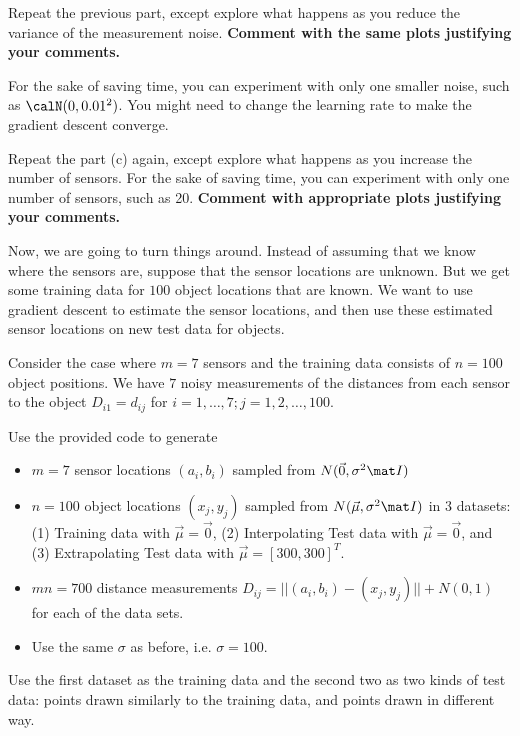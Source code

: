 \documentclass[preview]{standalone}
\begin{document}
\begin{Parts}
\Part Repeat the previous part, except explore what happens as you
reduce the variance of the measurement noise. {\bf Comment with the same plots justifying your comments.}

For the sake of saving time, you can experiment with only one smaller noise, such as $\calN(0, 0.01^2)$. You might need to change the learning rate to make the gradient descent converge.



\Part Repeat the part (c) again, except explore what happens as you
increase the number of sensors. For the sake of saving time, you can experiment with only one number of sensors, such as 20. {\bf Comment with appropriate plots
  justifying your comments.}



\Part Now, we are going to turn things around. Instead of assuming
that we know where the sensors are, suppose that the sensor locations
are unknown. But we get some training data for $100$ object
locations that are known. We want to use gradient descent to estimate
the sensor locations, and then use these estimated sensor locations on
new test data for objects.

Consider the case where $m=7$ sensors and the training data consists
of $n=100$ object positions. We have $7$ noisy measurements of the
distances from each sensor to the object
$D_{i1}=d_{ij}$ for $i=1,\dots,7;j=1,2,\dots,100$.

Use the provided code to generate
  \begin{itemize}
    \item $m=7$ sensor locations $(a_i, b_i)$ sampled from $N(\vec 0, \sigma^2 \mat I)$
    \item $n=100$ object locations $(x_j, y_j)$ sampled from $N(\vec \mu,
      \sigma^2 \mat I)$  in 3 datasets: (1) Training data with $\vec \mu =
      \vec{0}$, (2) Interpolating Test data with $\vec \mu = \vec{0}$, and
      (3) Extrapolating Test data with $\vec \mu = [300,300]^T$.

    \item $mn=700$ distance measurements $D_{ij} =
      ||(a_i,b_i)-(x_j,y_j)|| + N(0, 1)$ for each of the data sets.
	\item Use the same $\sigma$ as before, i.e. $\sigma=100$.
  \end{itemize}
Use the first dataset as the training data and the second two as two
kinds of test data: points drawn similarly to the training data, and
points drawn in different way.


\end{Parts}
\end{document}
